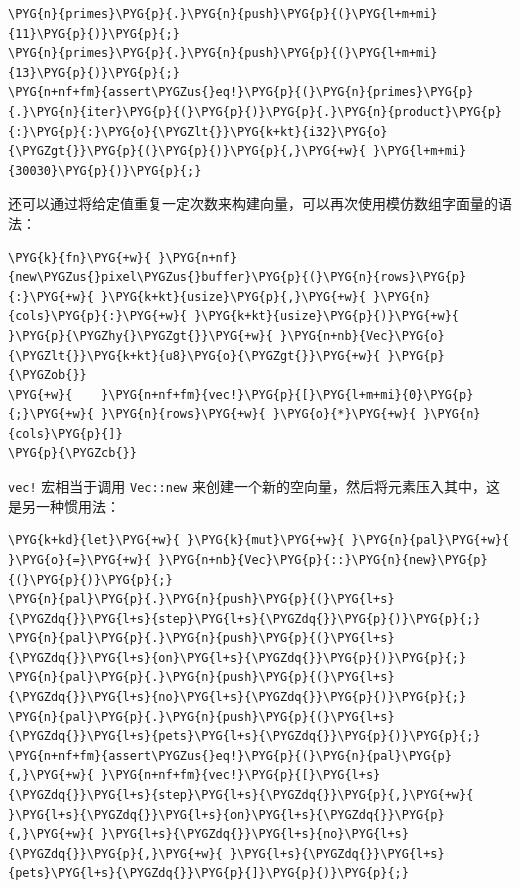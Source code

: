 \begin{Verbatim}[commandchars=\\\{\},breaklines=true,breakanywhere=true,fontsize=\codefont,xleftmargin=17bp]
\PYG{n}{primes}\PYG{p}{.}\PYG{n}{push}\PYG{p}{(}\PYG{l+m+mi}{11}\PYG{p}{)}\PYG{p}{;}
\PYG{n}{primes}\PYG{p}{.}\PYG{n}{push}\PYG{p}{(}\PYG{l+m+mi}{13}\PYG{p}{)}\PYG{p}{;}
\PYG{n+nf+fm}{assert\PYGZus{}eq!}\PYG{p}{(}\PYG{n}{primes}\PYG{p}{.}\PYG{n}{iter}\PYG{p}{(}\PYG{p}{)}\PYG{p}{.}\PYG{n}{product}\PYG{p}{:}\PYG{p}{:}\PYG{o}{\PYGZlt{}}\PYG{k+kt}{i32}\PYG{o}{\PYGZgt{}}\PYG{p}{(}\PYG{p}{)}\PYG{p}{,}\PYG{+w}{ }\PYG{l+m+mi}{30030}\PYG{p}{)}\PYG{p}{;}
\end{Verbatim}

还可以通过将给定值重复一定次数来构建向量，可以再次使用模仿数组字面量的语法：

\begin{Verbatim}[commandchars=\\\{\},breaklines=true,breakanywhere=true,fontsize=\codefont,xleftmargin=17bp]
\PYG{k}{fn}\PYG{+w}{ }\PYG{n+nf}{new\PYGZus{}pixel\PYGZus{}buffer}\PYG{p}{(}\PYG{n}{rows}\PYG{p}{:}\PYG{+w}{ }\PYG{k+kt}{usize}\PYG{p}{,}\PYG{+w}{ }\PYG{n}{cols}\PYG{p}{:}\PYG{+w}{ }\PYG{k+kt}{usize}\PYG{p}{)}\PYG{+w}{ }\PYG{p}{\PYGZhy{}\PYGZgt{}}\PYG{+w}{ }\PYG{n+nb}{Vec}\PYG{o}{\PYGZlt{}}\PYG{k+kt}{u8}\PYG{o}{\PYGZgt{}}\PYG{+w}{ }\PYG{p}{\PYGZob{}}
\PYG{+w}{    }\PYG{n+nf+fm}{vec!}\PYG{p}{[}\PYG{l+m+mi}{0}\PYG{p}{;}\PYG{+w}{ }\PYG{n}{rows}\PYG{+w}{ }\PYG{o}{*}\PYG{+w}{ }\PYG{n}{cols}\PYG{p}{]}
\PYG{p}{\PYGZcb{}}
\end{Verbatim}

\texttt{vec!} 宏相当于调用 \texttt{Vec::new} 来创建一个新的空向量，然后将元素压入其中，这是另一种惯用法：

\begin{Verbatim}[commandchars=\\\{\},breaklines=true,breakanywhere=true,fontsize=\codefont,xleftmargin=17bp]
\PYG{k+kd}{let}\PYG{+w}{ }\PYG{k}{mut}\PYG{+w}{ }\PYG{n}{pal}\PYG{+w}{ }\PYG{o}{=}\PYG{+w}{ }\PYG{n+nb}{Vec}\PYG{p}{::}\PYG{n}{new}\PYG{p}{(}\PYG{p}{)}\PYG{p}{;}
\PYG{n}{pal}\PYG{p}{.}\PYG{n}{push}\PYG{p}{(}\PYG{l+s}{\PYGZdq{}}\PYG{l+s}{step}\PYG{l+s}{\PYGZdq{}}\PYG{p}{)}\PYG{p}{;}
\PYG{n}{pal}\PYG{p}{.}\PYG{n}{push}\PYG{p}{(}\PYG{l+s}{\PYGZdq{}}\PYG{l+s}{on}\PYG{l+s}{\PYGZdq{}}\PYG{p}{)}\PYG{p}{;}
\PYG{n}{pal}\PYG{p}{.}\PYG{n}{push}\PYG{p}{(}\PYG{l+s}{\PYGZdq{}}\PYG{l+s}{no}\PYG{l+s}{\PYGZdq{}}\PYG{p}{)}\PYG{p}{;}
\PYG{n}{pal}\PYG{p}{.}\PYG{n}{push}\PYG{p}{(}\PYG{l+s}{\PYGZdq{}}\PYG{l+s}{pets}\PYG{l+s}{\PYGZdq{}}\PYG{p}{)}\PYG{p}{;}
\PYG{n+nf+fm}{assert\PYGZus{}eq!}\PYG{p}{(}\PYG{n}{pal}\PYG{p}{,}\PYG{+w}{ }\PYG{n+nf+fm}{vec!}\PYG{p}{[}\PYG{l+s}{\PYGZdq{}}\PYG{l+s}{step}\PYG{l+s}{\PYGZdq{}}\PYG{p}{,}\PYG{+w}{ }\PYG{l+s}{\PYGZdq{}}\PYG{l+s}{on}\PYG{l+s}{\PYGZdq{}}\PYG{p}{,}\PYG{+w}{ }\PYG{l+s}{\PYGZdq{}}\PYG{l+s}{no}\PYG{l+s}{\PYGZdq{}}\PYG{p}{,}\PYG{+w}{ }\PYG{l+s}{\PYGZdq{}}\PYG{l+s}{pets}\PYG{l+s}{\PYGZdq{}}\PYG{p}{]}\PYG{p}{)}\PYG{p}{;}
\end{Verbatim}

